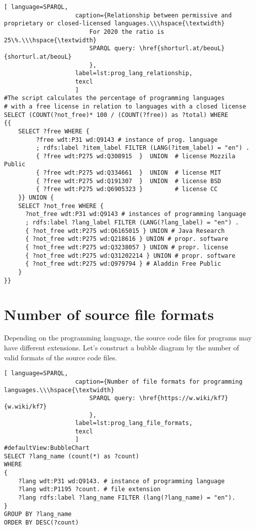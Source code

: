 \begin{lstlisting}[ language=SPARQL, 
                    caption={Relationship between permissive and proprietary or closed-licensed languages.\\\hspace{\textwidth}
                        For 2020 the ratio is 25\%.\\\hspace{\textwidth}
                        SPARQL query: \href{shorturl.at/beouL}{shorturl.at/beouL}
                        },
                    label=lst:prog_lang_relationship,
                    texcl 
                    ]
#The script calculates the percentage of programming languages 
# with a free license in relation to languages with a closed license
SELECT (COUNT(?not_free)* 100 / (COUNT(?free)) as ?total) WHERE
{{
    SELECT ?free WHERE {
         ?free wdt:P31 wd:Q9143 # instance of prog. language
         ; rdfs:label ?item_label FILTER (LANG(?item_label) = "en") . 
         { ?free wdt:P275 wd:Q308915  }  UNION  # license Mozzila Public
         { ?free wdt:P275 wd:Q334661  }  UNION  # license MIT
         { ?free wdt:P275 wd:Q191307  }  UNION  # license BSD
         { ?free wdt:P275 wd:Q6905323 }         # license CC
    }} UNION {
    SELECT ?not_free WHERE {
      ?not_free wdt:P31 wd:Q9143 # instances of programming language
      ; rdfs:label ?lang_label FILTER (LANG(?lang_label) = "en") .
      { ?not_free wdt:P275 wd:Q6165015 } UNION # Java Research
      { ?not_free wdt:P275 wd:Q218616 } UNION # propr. software
      { ?not_free wdt:P275 wd:Q3238057 } UNION # propr. license 
      { ?not_free wdt:P275 wd:Q31202214 } UNION # propr. software 
      { ?not_free wdt:P275 wd:Q979794 } # Aladdin Free Public
    }
}}
\end{lstlisting}%

\section{Number of source file formats}

Depending on the programming language, the source code files for programs may have different extensions. Let's construct a bubble diagram by the number of valid formats of the source code files.
\begin{lstlisting}[ language=SPARQL, 
                    caption={Number of file formats for programming languages.\\\hspace{\textwidth}
                        SPARQL query: \href{https://w.wiki/kf7}{w.wiki/kf7}
                        },
                    label=lst:prog_lang_file_formats,
                    texcl 
                    ]
#defaultView:BubbleChart
SELECT ?lang_name (count(*) as ?count)
WHERE
{
	?lang wdt:P31 wd:Q9143. # instance of programming language
	?lang wdt:P1195 ?count. # file extension
	?lang rdfs:label ?lang_name FILTER (lang(?lang_name) = "en").
}
GROUP BY ?lang_name 
ORDER BY DESC(?count)
\end{lstlisting}%

